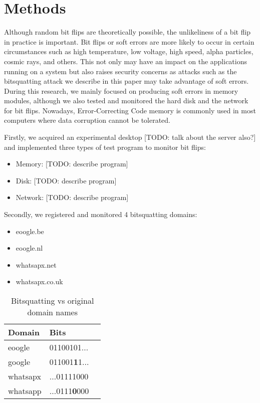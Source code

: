 \documentclass[conference]{IEEEtran}
\begin{document}
\section{Methods}\label{sec:method}

Although random bit flips are theoretically possible, the unlikeliness of a bit
flip in practice is important. Bit flips or soft errors are more likely to
occur in certain circumstances such as high temperature, low voltage, high
speed, alpha particles, cosmic rays, and others. This not only may have an
impact on the applications running on a system but also raises security
concerns as attacks such as the bitsquatting attack we describe in this paper
may take advantage of soft errors. During this research, we mainly focused on
producing soft errors in memory modules, although we also tested and monitored
the hard disk and the network for bit flips. Nowadays, Error-Correcting Code
memory is commonly used in most computers where data corruption cannot be
tolerated.

Firstly, we acquired an experimental desktop [TODO: talk about the server
also?] and implemented three types of test program to monitor bit flips:

\begin{itemize}
  \item Memory: [TODO: describe program]
  \item Disk: [TODO: describe program]
  \item Network: [TODO: describe program]
\end{itemize}

Secondly, we registered and monitored 4 bitsquatting domains:

\begin{itemize}
  \item eoogle.be
  \item eoogle.nl
  \item whatsapx.net
  \item whatsapx.co.uk
\end{itemize}

\begin{table}[H]
  \centering
  \caption{Bitsquatting vs original domain names}
  \label{table-bits}
  \begin{tabular}{|l|l|l|}
    \hline
    \textbf{Domain}   & \textbf{Bits} \\ \hline
    eoogle   & 01100101... \\ \hline
    google   & 011001\textbf{1}1... \\ \hline
    whatsapx & ...01111000 \\ \hline
    whatsapp & ...0111\textbf{0}000 \\ \hline
   \end{tabular}
\end{table}
\end{document}
